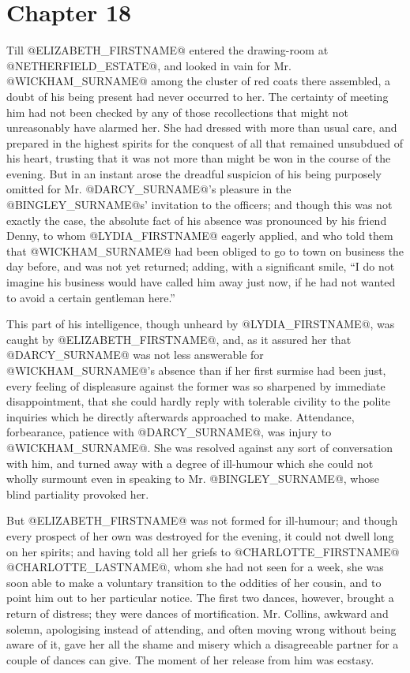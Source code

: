 \chapter*{Chapter 18}


Till @ELIZABETH_FIRSTNAME@ entered the drawing-room at @NETHERFIELD_ESTATE@, and looked in
vain for Mr. @WICKHAM_SURNAME@ among the cluster of red coats there assembled, a
doubt of his being present had never occurred to her. The certainty
of meeting him had not been checked by any of those recollections that
might not unreasonably have alarmed her. She had dressed with more than
usual care, and prepared in the highest spirits for the conquest of all
that remained unsubdued of his heart, trusting that it was not more than
might be won in the course of the evening. But in an instant arose
the dreadful suspicion of his being purposely omitted for Mr. @DARCY_SURNAME@'s
pleasure in the @BINGLEY_SURNAME@s' invitation to the officers; and though
this was not exactly the case, the absolute fact of his absence was
pronounced by his friend Denny, to whom @LYDIA_FIRSTNAME@ eagerly applied, and who
told them that @WICKHAM_SURNAME@ had been obliged to go to town on business the
day before, and was not yet returned; adding, with a significant smile,
``I do not imagine his business would have called him away just now, if
he had not wanted to avoid a certain gentleman here.''

This part of his intelligence, though unheard by @LYDIA_FIRSTNAME@, was caught by
@ELIZABETH_FIRSTNAME@, and, as it assured her that @DARCY_SURNAME@ was not less answerable for
@WICKHAM_SURNAME@'s absence than if her first surmise had been just, every
feeling of displeasure against the former was so sharpened by immediate
disappointment, that she could hardly reply with tolerable civility to
the polite inquiries which he directly afterwards approached to make.
Attendance, forbearance, patience with @DARCY_SURNAME@, was injury to @WICKHAM_SURNAME@. She
was resolved against any sort of conversation with him, and turned away
with a degree of ill-humour which she could not wholly surmount even in
speaking to Mr. @BINGLEY_SURNAME@, whose blind partiality provoked her.

But @ELIZABETH_FIRSTNAME@ was not formed for ill-humour; and though every prospect
of her own was destroyed for the evening, it could not dwell long on her
spirits; and having told all her griefs to @CHARLOTTE_FIRSTNAME@ @CHARLOTTE_LASTNAME@, whom she had
not seen for a week, she was soon able to make a voluntary transition
to the oddities of her cousin, and to point him out to her particular
notice. The first two dances, however, brought a return of distress;
they were dances of mortification. Mr. Collins, awkward and solemn,
apologising instead of attending, and often moving wrong without being
aware of it, gave her all the shame and misery which a disagreeable
partner for a couple of dances can give. The moment of her release from
him was ecstasy.

